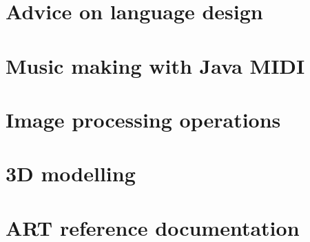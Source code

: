 \documentclass[11pt]{book}
\begin{document}
\chapter{Advice on language design}
\label{advice:chapter}
\appendix
\chapter{Music making with Java MIDI}
\label{music:chapter}
\chapter{Image processing operations}
\label{ip:chapter}
\chapter{3D modelling}
\label{3d:chapter}
\chapter{ART reference documentation}
\printnomenclature
\end{document}
